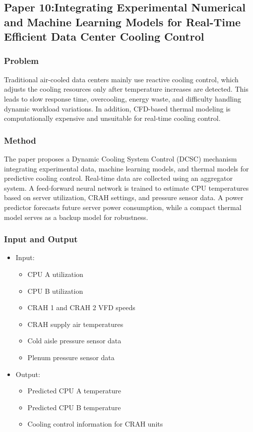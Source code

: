 \documentclass[12pt,a4paper]{article}
\begin{document}
\newpage
\subsection{Paper 10:Integrating Experimental Numerical and Machine Learning Models for Real-Time Efficient Data Center Cooling Control}
    \subsubsection{Problem}
    Traditional air-cooled data centers mainly use reactive cooling control, which adjusts the cooling resources only after temperature increases are detected. This leads to slow response time, overcooling, energy waste, and difficulty handling dynamic workload variations. In addition, CFD-based thermal modeling is computationally expensive and unsuitable for real-time cooling control.

    \subsubsection{Method}
    The paper proposes a Dynamic Cooling System Control (DCSC) mechanism integrating experimental data, machine learning models, and thermal models for predictive cooling control. Real-time data are collected using an aggregator system. A feed-forward neural network is trained to estimate CPU temperatures based on server utilization, CRAH settings, and pressure sensor data. A power predictor forecasts future server power consumption, while a compact thermal model serves as a backup model for robustness.

    \subsubsection{Input and Output}
                \begin{itemize}
                \item Input:
                \begin{itemize}
                    \item CPU A utilization
                    \item CPU B utilization
                    \item CRAH 1 and CRAH 2 VFD speeds
                    \item CRAH supply air temperatures
                    \item Cold aisle pressure sensor data
                    \item Plenum pressure sensor data
                \end{itemize}
            
                \item Output:
                \begin{itemize}
                    \item Predicted CPU A temperature
                    \item Predicted CPU B temperature
                    \item Cooling control information for CRAH units
                \end{itemize}
            \end{itemize}
\end{document}
